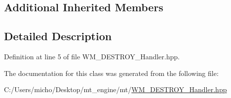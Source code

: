 \subsection*{Additional Inherited Members}


\subsection{Detailed Description}


Definition at line 5 of file W\+M\+\_\+\+D\+E\+S\+T\+R\+O\+Y\+\_\+\+Handler.\+hpp.



The documentation for this class was generated from the following file\+:\begin{DoxyCompactItemize}
\item 
C\+:/\+Users/micho/\+Desktop/mt\+\_\+engine/mt/\hyperlink{_w_m___d_e_s_t_r_o_y___handler_8hpp}{W\+M\+\_\+\+D\+E\+S\+T\+R\+O\+Y\+\_\+\+Handler.\+hpp}\end{DoxyCompactItemize}
